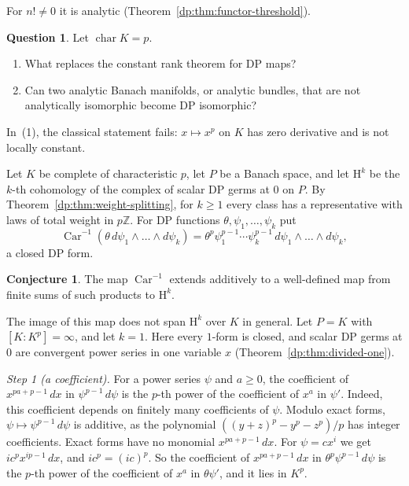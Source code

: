 \documentclass[11pt]{amsart}
\theoremstyle{definition}
\theoremstyle{remark}
\numberwithin{equation}{section}
\newcommand{\Z}{\mathbb Z}
\theoremstyle{plain}
\theoremstyle{definition}
\newtheorem{conjecture}[theorem]{Conjecture}
\newtheorem{question}[theorem]{Question}
\theoremstyle{plain}
\begin{document}
For $n!\ne0$ it is analytic (Theorem~\ref{dp:thm:functor-threshold}).

\begin{question}\label{dp:q:forms}
Let $\operatorname{char}K=p$.
\begin{enumerate}
\item What replaces the constant rank theorem for DP maps?
\item Can two analytic Banach manifolds, or analytic bundles, that are not analytically isomorphic become DP isomorphic?
\end{enumerate}
\end{question}

In~(1), the classical statement fails: $x\mapsto x^p$ on $K$ has zero derivative and is not locally constant.

Let $K$ be complete of characteristic $p$, let $P$ be a Banach space, and let $\mathrm H^k$ be the $k$-th cohomology of the complex of scalar DP germs at $0$ on $P$. By Theorem~\ref{dp:thm:weight-splitting}, for $k\ge1$ every class has a representative with laws of total weight in $p\Z$. For DP functions $\theta,\psi_1,\dots,\psi_k$ put
\[
 \operatorname{Car}^{-1}(\theta\,d\psi_1\wedge\dots\wedge d\psi_k)=\theta^p\psi_1^{p-1}\cdots\psi_k^{p-1}\,d\psi_1\wedge\dots\wedge d\psi_k,
\]
a closed DP form.

\begin{conjecture}\label{dp:conj:cartier}
The map $\operatorname{Car}^{-1}$ extends additively to a well-defined map from finite sums of such products to $\mathrm H^k$.
\end{conjecture}

The image of this map does not span $\mathrm H^k$ over $K$ in general. Let $P=K$ with $[K:K^p]=\infty$, and let $k=1$. Here every $1$-form is closed, and scalar DP germs at $0$ are convergent power series in one variable $x$ (Theorem~\ref{dp:thm:divided-one}).

\emph{Step 1 (a coefficient).} For a power series $\psi$ and $a\ge0$, the coefficient of $x^{pa+p-1}\,dx$ in $\psi^{p-1}\,d\psi$ is the $p$-th power of the coefficient of $x^a$ in $\psi'$. Indeed, this coefficient depends on finitely many coefficients of $\psi$. Modulo exact forms, $\psi\mapsto\psi^{p-1}\,d\psi$ is additive, as the polynomial $((y+z)^p-y^p-z^p)/p$ has integer coefficients. Exact forms have no monomial $x^{pa+p-1}\,dx$. For $\psi=cx^i$ we get $ic^px^{ip-1}\,dx$, and $ic^p=(ic)^p$. So the coefficient of $x^{pa+p-1}\,dx$ in $\theta^p\psi^{p-1}\,d\psi$ is the $p$-th power of the coefficient of $x^a$ in $\theta\psi'$, and it lies in $K^p$.
\end{document}
